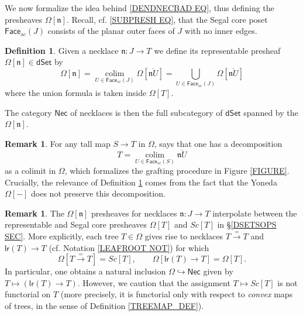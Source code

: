 \documentclass[a4paper,10pt]{article}%
\numberwithin{equation}{section}
\numberwithin{figure}{section}
\theoremstyle{definition} %
\newtheorem{definition}[equation]{Definition}%
\newtheorem{remark}[equation]{Remark}%
\DeclareMathOperator{\colim}{colim}
\begin{document}
We now formalize the idea behind \eqref{DENDNECBAD EQ},
thus defining the presheaves $\Omega[\mathfrak{n}]$.
Recall, cf. \eqref{SUBPRESH EQ}, 
that the Segal core poset
$\mathsf{Face}_{sc}(J)$
consists of the planar outer faces of $J$ with no inner edges.


\begin{definition}
        \label{NECKREP_DEF}
	Given a necklace $\mathfrak{n} \colon J \to T$ 
	we define its representable presheaf
	$\Omega[\mathfrak{n}] \in \mathsf{dSet}$ by
	\begin{equation}
	\Omega[\mathfrak{n}] 
	= 
	\underset{U \in \mathsf{Face}_{sc}(J)}{\colim}
	\Omega[\overline{\mathfrak{n} U}]
	=
	\bigcup_{U \in \mathsf{Face}_{sc}(J)} 
	\Omega[\overline{\mathfrak{n} U}]
	\end{equation}
	where the union formula is taken inside $\Omega[T]$.
	
	The category $\mathsf{Nec}$ of necklaces is then the full subcategory of $\mathsf{dSet}$
	spanned by the $\Omega[\mathfrak{n}]$.
\end{definition}


\begin{remark}\label{GRAFT REM}
For any tall map $S \to T$ in $\Omega$,
\cite[Cor. 3.75]{BP_geo} says that
one has a decomposition
\[T= 
\underset{U \in \mathsf{Face}_{sc}(S)}{\colim}
\overline{\mathfrak{n} U}
\]
as a colimit in $\Omega$, 
which formalizes the grafting procedure in Figure \ref{FIGURE}.
Crucially, the relevance of Definition \ref{NECKREP_DEF} 
comes from the fact that the Yoneda $\Omega[-]$
does not preserve this decomposition.
\end{remark}



\begin{remark}\label{SEGISNEC REM}
	The $\Omega[\mathfrak{n}]$ presheaves for necklaces
	$\mathfrak{n}\colon J \to T$
	interpolate between the representable and 
	Segal core presheaves $\Omega[T]$ and $Sc[T]$
	in \S \ref{DSETSOPS SEC}.
	More explicitly,
	each tree $T \in \Omega$
	gives rise to necklaces
	$T \xrightarrow{=} T$ and
	$\mathsf{lr}(T) \to T$
	(cf. Notation \ref{LEAFROOT NOT})
	for which
\[
	\Omega[T \xrightarrow{=} T] = Sc[T],
\qquad
	\Omega[\mathsf{lr}(T) \to T] = \Omega[T].
\]
        In particular,
        one obtains a natural inclusion
        $\Omega \hookrightarrow \mathsf{Nec}$
        given by $T \mapsto \left( \mathsf{lr}(T) \to T \right)$.
        However, we caution that the assignment
        $T \mapsto Sc[T]$ is not functorial on $T$
        (more precisely, it is functorial only with respect to \emph{convex} maps of trees,
        in the sense of Definition \ref{TREEMAP_DEF}). 
\end{remark}
\end{document}
